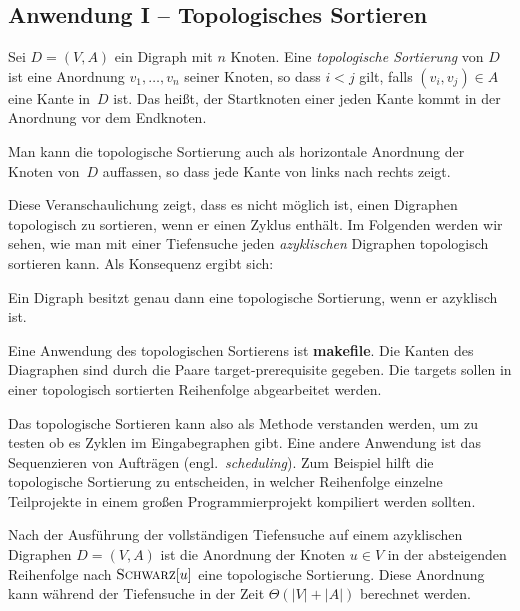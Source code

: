 \subsection{Anwendung I -- Topologisches Sortieren}

\begin{defn} 
Sei $D=(V,A)$ ein Digraph mit $n$ Knoten.
Eine \emph{topologische Sortierung} von $D$ ist eine Anordnung $v_1,\ldots,v_n$ seiner Knoten, so dass $i < j$ gilt, falls $(v_i,v_j) \in A$ eine Kante in~$D$ ist.
Das heißt, der Startknoten einer jeden Kante kommt in der Anordnung vor dem Endknoten.
\end{defn} 

\begin{bem}
Man kann die topologische Sortierung auch als horizontale Anordnung der Knoten von~$D$ auffassen, so dass jede Kante von links nach rechts zeigt.

Diese Veranschaulichung zeigt, dass es nicht möglich ist, einen Digraphen topologisch zu sortieren, wenn er einen Zyklus enthält.
Im Folgenden werden wir sehen, wie man mit einer Tiefensuche jeden \emph{azyklischen} Digraphen topologisch sortieren kann.
Als Konsequenz ergibt sich:
\end{bem} 

\begin{prop}
Ein Digraph besitzt genau dann eine topologische Sortierung, wenn er azyklisch ist.
\end{prop}

\begin{bem}
	Eine Anwendung des topologischen Sortierens ist \textbf{makefile}. Die Kanten des Diagraphen sind durch  die Paare target-prerequisite gegeben. Die targets sollen in einer topologisch sortierten Reihenfolge abgearbeitet werden. 
\end{bem} 


\begin{bem} 
Das topologische Sortieren kann also als Methode verstanden werden, um zu testen ob es Zyklen im Eingabegraphen gibt.
Eine andere Anwendung ist das Sequenzieren von Aufträgen (engl.~\emph{scheduling}).
Zum Beispiel hilft die topologische Sortierung zu entscheiden, in welcher Reihenfolge einzelne Teilprojekte in einem großen Programmierprojekt kompiliert werden sollten.
\end{bem} 



\begin{thm}
	Nach der Ausführung der vollständigen Tiefensuche auf einem azyklischen Digraphen $D=(V,A)$ ist die Anordnung der Knoten $u \in V$ in der absteigenden Reihenfolge nach $\mathop{\text{\textsc{Schwarz}}}[u]$ eine topologische Sortierung. Diese Anordnung kann während der Tiefensuche in der Zeit $\Theta(|V|+|A|)$ berechnet werden. 
\end{thm}

